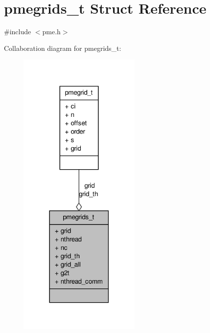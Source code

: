 \hypertarget{structpmegrids__t}{\section{pmegrids\-\_\-t \-Struct \-Reference}
\label{structpmegrids__t}
}


{\ttfamily \#include $<$pme.\-h$>$}



\-Collaboration diagram for pmegrids\-\_\-t\-:
\nopagebreak
\begin{figure}[H]
\begin{center}
\leavevmode
\includegraphics[width=170pt]{structpmegrids__t__coll__graph}
\end{center}
\end{figure}

